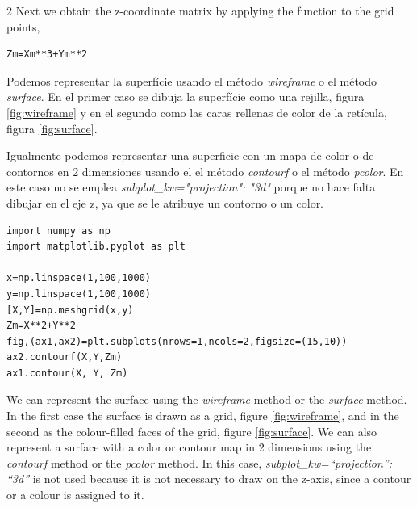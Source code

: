 \begin{paracol} {2}
Next we obtain the z-coordinate matrix by applying the function to the grid points,

\begin{verbatim}
Zm=Xm**3+Ym**2
\end{verbatim}

\switchcolumn
Podemos representar la superfície usando el método \textit{wireframe} o el método \textit{surface}. En el primer caso se dibuja la superfície como una rejilla, figura \ref{fig:wireframe} y en el segundo como las caras rellenas de color de la retícula, figura \ref{fig:surface}.

Igualmente podemos representar una superficie con un mapa de color o de contornos en 2 dimensiones usando el el método \textit{contourf} o el método \textit{pcolor}. En este caso no se emplea \textit{subplot_kw="projection": "3d"} porque no hace falta dibujar en el eje z, ya que se le atribuye un contorno o un color.

\begin{verbatim}
import numpy as np
import matplotlib.pyplot as plt

x=np.linspace(1,100,1000)
y=np.linspace(1,100,1000)
[X,Y]=np.meshgrid(x,y)
Zm=X**2+Y**2
fig,(ax1,ax2)=plt.subplots(nrows=1,ncols=2,figsize=(15,10))
ax2.contourf(X,Y,Zm)
ax1.contour(X, Y, Zm)

\end{verbatim}

\switchcolumn

We can represent the surface using the \textit{wireframe} method or the \textit{surface} method. In the first case the surface is drawn as a grid, figure \ref{fig:wireframe}, and in the second as the colour-filled faces of the grid, figure \ref{fig:surface}.
We can also represent a surface with a color or contour map in 2 dimensions using the \textit{contourf} method or the \textit{pcolor} method. In this case, \textit{subplot_kw=“projection”: “3d”} is not used because it is not necessary to draw on the z-axis, since a contour or a colour is assigned to it.



\end{paracol}

